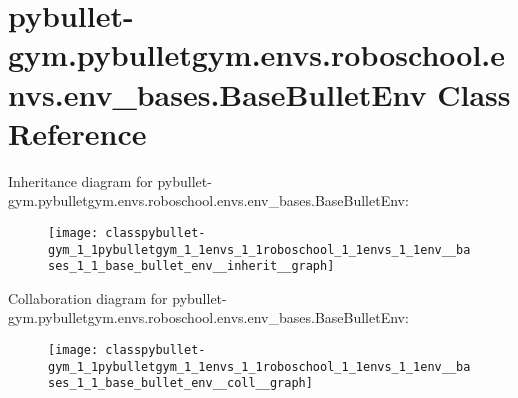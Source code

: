 \hypertarget{classpybullet-gym_1_1pybulletgym_1_1envs_1_1roboschool_1_1envs_1_1env__bases_1_1_base_bullet_env}{}\section{pybullet-\/gym.pybulletgym.\+envs.\+roboschool.\+envs.\+env\+\_\+bases.\+Base\+Bullet\+Env Class Reference}
\label{classpybullet-gym_1_1pybulletgym_1_1envs_1_1roboschool_1_1envs_1_1env__bases_1_1_base_bullet_env}


Inheritance diagram for pybullet-\/gym.pybulletgym.\+envs.\+roboschool.\+envs.\+env\+\_\+bases.\+Base\+Bullet\+Env\+:
\nopagebreak
\begin{figure}[H]
\begin{center}
\leavevmode
\texttt{[image: classpybullet-gym\_1\_1pybulletgym\_1\_1envs\_1\_1roboschool\_1\_1envs\_1\_1env\_\_bases\_1\_1\_base\_bullet\_env\_\_inherit\_\_graph]}
\end{center}
\end{figure}


Collaboration diagram for pybullet-\/gym.pybulletgym.\+envs.\+roboschool.\+envs.\+env\+\_\+bases.\+Base\+Bullet\+Env\+:
\nopagebreak
\begin{figure}[H]
\begin{center}
\leavevmode
\texttt{[image: classpybullet-gym\_1\_1pybulletgym\_1\_1envs\_1\_1roboschool\_1\_1envs\_1\_1env\_\_bases\_1\_1\_base\_bullet\_env\_\_coll\_\_graph]}
\end{center}
\end{figure}
